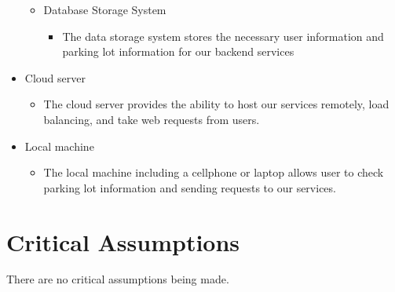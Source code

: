 \documentclass[12pt,letterpaper]{article}
\begin{document}
\begin{itemize}
\begin{itemize}
    \item Database Storage System
    \begin{itemize}
        \item The data storage system stores the necessary user information and
        parking lot information for our backend services
    \end{itemize}
    \end{itemize}
    \item Cloud server
    \begin{itemize}
        \item The cloud server provides the ability to host our services
        remotely, load balancing, and take web requests from users.
    \end{itemize}
    \item Local machine
    \begin{itemize}
        \item The local machine including a cellphone or laptop allows user to
        check parking lot information and sending requests to our services. 
    \end{itemize}
\end{itemize}

\section{Critical Assumptions}
There are no critical assumptions being made.

\newpage

\end{document}
